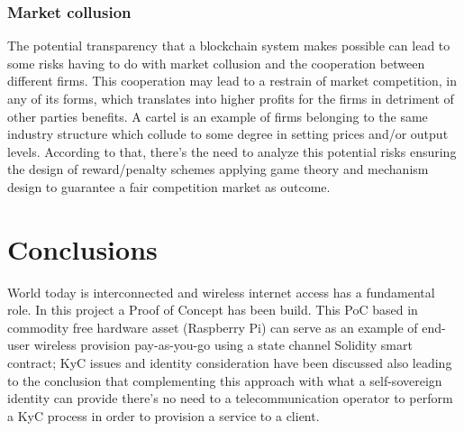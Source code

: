 \documentclass[12pt]{amsart}
\begin{document}
\begin{multicols}{2}
\subsubsection{Market collusion}

The potential transparency that a blockchain system makes possible can
lead to some risks having to do with market collusion and
the cooperation between different firms.
This cooperation may lead to a restrain of market competition,
in any of its forms, which translates into higher
profits for the firms in detriment of other parties benefits.
A cartel is an example of firms belonging to
the same industry structure which collude to some degree in
setting prices and/or output levels. According to that,
there's the need to analyze this potential risks ensuring
the design of reward/penalty schemes applying game theory and
mechanism design to
guarantee a fair competition market as outcome.






\section{Conclusions}\label{sec:conclusions}

\vspace{0.35cm}

World today is interconnected and wireless
internet access has a fundamental role. In this project
a Proof of Concept has been build. This PoC based in
commodity free hardware asset (Raspberry Pi) can serve
as an example of end-user wireless provision pay-as-you-go
using a state channel Solidity smart contract; KyC issues
and identity consideration have been discussed also leading
to the conclusion that complementing this approach with
what a self-sovereign identity can provide there's no need
to a telecommunication operator to perform a KyC process
in order to provision a service to a client.


\end{multicols}
\end{document}
